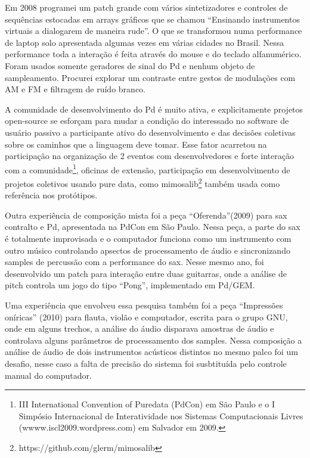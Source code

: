 \documentclass{ppgmus}
\begin{document}
Em 2008 programei um patch grande com vários sintetizadores e controles de sequências estocadas
em arrays gráficos que se chamou ``Ensinando instrumentos virtuais a dialogarem de maneira rude''.
O que se transformou numa performance de laptop solo apresentada algumas vezes em várias
cidades no Brasil. Nessa performance toda a interação é feita através do mouse e do 
teclado alfanumérico. Foram usados somente geradores de sinal do Pd e nenhum objeto de sampleamento.
 Procurei explorar um contraste entre gestos de modulações com AM e FM e filtragem de ruído branco.

A comunidade de desenvolvimento do Pd é muito ativa, e explicitamente projetos open-source
se esforçam para mudar a condição do interessado no software de usuário passivo a participante ativo do desenvolvimento
e das decisões coletivas sobre os caminhos que a linguagem deve tomar. Esse  fator acarretou na participação na
organização de 2 eventos com desenvolvedores e forte interação com a comunidade\footnote{III International
Convention of Puredata (PdCon) em São Paulo e o I Simpósio Internacional de Interatividade nos Sistemas
Computacionais Livres (wwww.iscl2009.wordpress.com) em Salvador em 2009.}, oficinas de extensão, 
participação em desenvolvimento de projetos coletivos usando pure data, como mimosalib\footnote
{https://github.com/glerm/mimosalib} também usada como referência nos protótipos.

Outra experiência de composição mista foi a peça ``Oferenda''(2009) para sax contralto e Pd, 
apresentada na PdCon em São Paulo. Nessa peça, a parte do sax é totalmente improvisada e 
o computador funciona como um instrumento com outro músico controlando apsectos de 
processamento de áudio e sincronizando samples de percussão com a performance do sax. 
Nesse mesmo ano, foi desenvolvido um patch para interação entre duas guitarras, onde a
análise de pitch controla um jogo do tipo ``Pong'', implementado em Pd/GEM. 

Uma experiência que envolveu essa pesquisa também foi a peça ``Impressões oníricas'' (2010) para flauta,
violão e computador, escrita para o grupo GNU, onde em alguns trechos, a análise do áudio
disparava amostras de áudio e controlava alguns parâmetros de processamento dos samples. 
Nessa composição a análise de áudio de dois instrumentos acústicos distintos no mesmo palco foi 
um desafio, nesse caso a falta de precisão do sistema foi susbtituída pelo controle manual
do computador.
\end{document}
